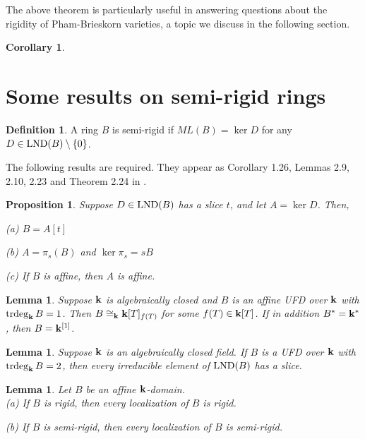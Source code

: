 \documentclass[12pt]{amsart}
\theoremstyle{plain}
\newtheorem{proposition}[subsection]{Proposition}
\newtheorem{lemma}[subsection]{Lemma}
\newtheorem{corollary}[subsection]{Corollary}
\theoremstyle{definition}
\newtheorem{definition}[subsection]{Definition}
\newcommand{\trdeg}{	\operatorname{{\rm trdeg}}}
\newcommand{\bk}{{\ensuremath{\rm \bf k}}}
\newcommand{\lnd}{\operatorname{{\rm LND}}}
\newcommand{\isom}{\cong}
\begin{document}
The above theorem is particularly useful in answering questions about the rigidity of Pham-Brieskorn varieties, a topic we discuss in the following section. 

\begin{corollary}
	
\end{corollary}

\section{Some results on semi-rigid rings}

\begin{definition}
	A ring $B$ is semi-rigid if $ML(B) = \ker D$ for any $D \in \lnd(B) \setminus\{0\}$. 
\end{definition}

The following results are required. They appear as Corollary 1.26, Lemmas 2.9, 2.10, 2.23 and Theorem 2.24 in \cite{freudenburg2017algebraic}.

\begin{proposition}\label{sliceTheorem}
	Suppose $D \in \lnd(B)$ has a slice $t$, and let $A = \ker D$. Then,
	
	(a) $B = A[t]$
	
	(b) $A = \pi_s(B)$ and $\ker \pi_s = sB$
	
	(c) If $B$ is affine, then $A$ is affine. 
	
\end{proposition}

\begin{lemma} \label{FV2-2.9}
	Suppose $\bk$ is algebraically closed and $B$ is an affine UFD over $\bk$ with $\trdeg_\bk B = 1$. Then $B \isom_\bk \bk[T]_{f(T)}$ for some $f(T) \in \bk[T]$. If in addition $B^* = \bk^*$, then $B = \bk^{[1]}$. 
\end{lemma}


\begin{lemma}\label{FV2-2.10}
	Suppose $\bk$ is an algebraically closed field. If $B$ is a UFD over $\bk$ with $\trdeg_\bk B = 2$, then every irreducible element of $\lnd(B)$ has a slice. 
\end{lemma}

\begin{lemma} \label{rigidLocalization}
	Let $B$ be an affine $\bk$-domain. 
	\\
	
	(a) If $B$ is rigid, then every localization of $B$ is rigid. 
	
	(b) If $B$ is semi-rigid, then every localization of $B$ is semi-rigid. 
\end{lemma}
\end{document}
